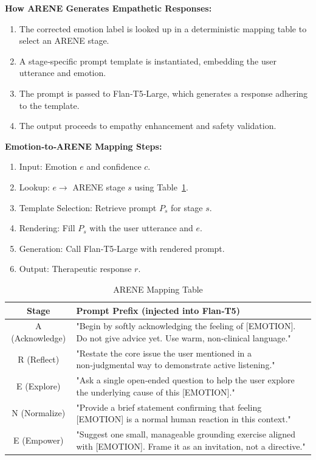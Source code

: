 \documentclass[12pt,twoside]{article}
\begin{document}
\textbf{How ARENE Generates Empathetic Responses:}
\begin{enumerate}[leftmargin=2em]
  \item The corrected emotion label is looked up in a deterministic mapping table to select an ARENE stage.
  \item A stage‑specific prompt template is instantiated, embedding the user utterance and emotion.
  \item The prompt is passed to Flan‑T5‑Large, which generates a response adhering to the template.
  \item The output proceeds to empathy enhancement and safety validation.
\end{enumerate}

\textbf{Emotion‑to‑ARENE Mapping Steps:}
\begin{enumerate}[leftmargin=2em]
  \item Input: Emotion $e$ and confidence $c$.
  \item Lookup: $e \rightarrow$ ARENE stage $s$ using Table~\ref{tab:arene_mapping}.
  \item Template Selection: Retrieve prompt $P_s$ for stage $s$.
  \item Rendering: Fill $P_s$ with the user utterance and $e$.
  \item Generation: Call Flan‑T5‑Large with rendered prompt.
  \item Output: Therapeutic response $r$.
\end{enumerate}

\begin{table}[H]
\centering
\caption{ARENE Mapping Table}
\begin{tabular}{|c|p{9cm}|}
\hline
\rowcolor{gray!20}
\textbf{Stage} & \textbf{Prompt Prefix (injected into Flan‑T5)} \\
\hline
A (Acknowledge) & "Begin by softly acknowledging the feeling of [EMOTION]. Do not give advice yet. Use warm, non‑clinical language." \\
\hline
R (Reflect) & "Restate the core issue the user mentioned in a non‑judgmental way to demonstrate active listening." \\
\hline
E (Explore) & "Ask a single open‑ended question to help the user explore the underlying cause of this [EMOTION]." \\
\hline
N (Normalize) & "Provide a brief statement confirming that feeling [EMOTION] is a normal human reaction in this context." \\
\hline
E (Empower) & "Suggest one small, manageable grounding exercise aligned with [EMOTION]. Frame it as an invitation, not a directive." \\
\hline
\end{tabular}
\label{tab:arene_mapping}
\end{table}
\end{document}

